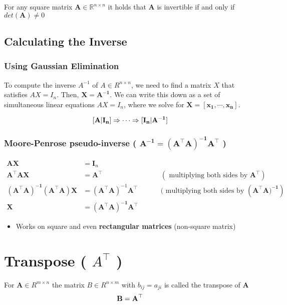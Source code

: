 \begin{theorem}
    For any square matrix $\mathbf{A} \in \mathbb{R}^{n\times n}$ it holds that $\mathbf{A}$ is invertible if and only if $det(\mathbf{A}) \neq 0$
\end{theorem}

\subsection{Calculating the Inverse \cite{mfml-1}}

\subsubsection{Using Gaussian Elimination}
To compute the inverse $A^{-1}$ of $A \in R^{n\times n}$, we need to find a matrix $X$ that satisfies $AX=I_n$. Then, $\mathbf{X = A^{-1}}$. We can write this down as a set of simultaneous linear equations $AX=I_n$, where we solve for $\mathbf{X = [x_1,\cdots,x_n]}$.

\[
    \displaystyle
    \hfill
    \mathbf{[A|I_n] \Rightarrow \cdots \Rightarrow [I_n|A^{-1}]}
    \hfill
\]

\subsubsection{Moore-Penrose pseudo-inverse ( $\mathbf{A^{-1} = (A^\top A)^{-1}A^\top }$ ) \cite{mfml-1}} \label{Moore-Penrose pseudo-inverse}

\begin{align*}
    \mathbf{AX} &= \mathbf{I}_n \\
    \mathbf{A^\top AX} &= \mathbf{A^\top} &&&& (\text{ multiplying both sides by } \mathbf{A^\top}) \\
    \mathbf{(A^\top A)^{-1}(A^\top A)X} &= (\mathbf{A^\top A})^{-1}\mathbf{A^\top} &&&& (\text{ multiplying both sides by } (\mathbf{A^\top A)^{-1}}) \\
    \mathbf{X} &= \mathbf{(A^\top A)^{-1}A^\top }
\end{align*}


\begin{itemize}
    \item Works on square and even \textbf{rectangular matrices} (non-square matrix)
\end{itemize}


\section{Transpose ( $A^\top$ ) \cite{mfml-1}}\label{matrix: Transpose}
For $\mathbf{A} \in R^{m\times n}$ the matrix $B \in R^{n\times m}$ with $b_{ij} = a_{ji}$ is called the transpose of $\mathbf{A}$
\[
    \hfill
    \mathbf{B = A}^\top
    \hfill
\]


